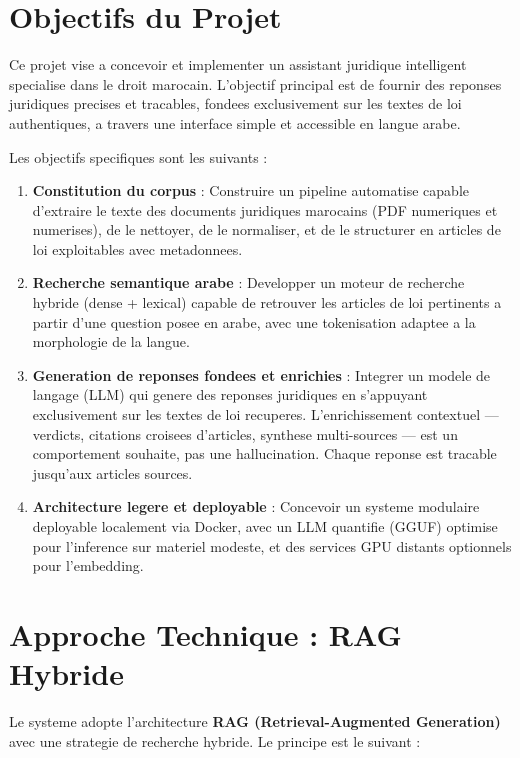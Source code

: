 \section{Objectifs du Projet}

Ce projet vise a concevoir et implementer un assistant juridique intelligent specialise dans le droit marocain. L'objectif principal est de fournir des reponses juridiques precises et tracables, fondees exclusivement sur les textes de loi authentiques, a travers une interface simple et accessible en langue arabe.

Les objectifs specifiques sont les suivants :

\begin{enumerate}
    \item \textbf{Constitution du corpus} : Construire un pipeline automatise capable d'extraire le texte des documents juridiques marocains (PDF numeriques et numerises), de le nettoyer, de le normaliser, et de le structurer en articles de loi exploitables avec metadonnees.

    \item \textbf{Recherche semantique arabe} : Developper un moteur de recherche hybride (dense + lexical) capable de retrouver les articles de loi pertinents a partir d'une question posee en arabe, avec une tokenisation adaptee a la morphologie de la langue.

    \item \textbf{Generation de reponses fondees et enrichies} : Integrer un modele de langage (LLM) qui genere des reponses juridiques en s'appuyant exclusivement sur les textes de loi recuperes. L'enrichissement contextuel --- verdicts, citations croisees d'articles, synthese multi-sources --- est un comportement souhaite, pas une hallucination. Chaque reponse est tracable jusqu'aux articles sources.

    \item \textbf{Architecture legere et deployable} : Concevoir un systeme modulaire deployable localement via Docker, avec un LLM quantifie (GGUF) optimise pour l'inference sur materiel modeste, et des services GPU distants optionnels pour l'embedding.
\end{enumerate}

\section{Approche Technique : RAG Hybride}

Le systeme adopte l'architecture \textbf{RAG (Retrieval-Augmented Generation)} avec une strategie de recherche hybride. Le principe est le suivant :

